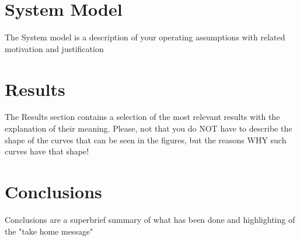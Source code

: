 \documentclass[conference,10pt]{IEEEtran}
\begin{document}
\section{System Model}\label{sec:symo}
The System model is a description of your operating assumptions with related motivation and justification

\section{Results}\label{sec:res}
The Results section contains a selection of the most relevant results with the explanation of their meaning. Please, not that you do NOT have to describe the shape of the curves that can be seen in the figures, but the reasons WHY such curves have that shape!

\section{Conclusions}\label{sec:conclusion}
Conclusions are a superbrief summary of what has been done and highlighting of the "take home message"


\newpage
\nocite{*}


\end{document}
